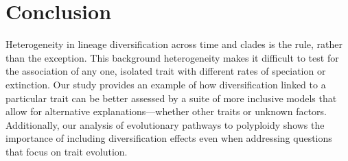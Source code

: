 

\section{Conclusion}


Heterogeneity in lineage diversification across time and clades is the rule, rather than the exception.
This background heterogeneity makes it difficult to test for the association of any one, isolated trait with different rates of speciation or extinction.
Our study provides an example of how diversification linked to a particular trait can be better assessed by a suite of more inclusive models that allow for alternative explanations---whether other traits or unknown factors.
Additionally, our analysis of evolutionary pathways to polyploidy shows the importance of including diversification effects even when addressing questions that focus on trait evolution.
